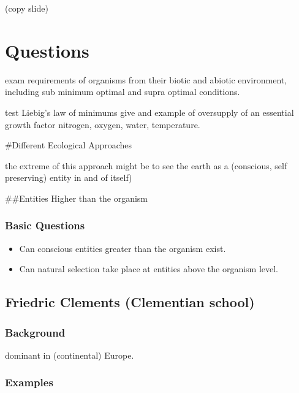 \documentclass[]{article}
\providecommand{\tightlist}{%
  \setlength{\itemsep}{0pt}\setlength{\parskip}{0pt}}
\begin{document}
(copy slide)

\hypertarget{questions}{%
\section{Questions}\label{questions}}

exam requirements of organisms from their biotic and abiotic
environment, including sub minimum optimal and supra optimal conditions.

test Liebig's law of minimums give and example of oversupply of an
essential growth factor nitrogen, oxygen, water, temperature.

\#Different Ecological Approaches

the extreme of this approach might be to see the earth as a (conscious,
self preserving) entity in and of itself)

\#\#Entities Higher than the organism

\hypertarget{basic-questions}{%
\subsubsection{Basic Questions}\label{basic-questions}}

\begin{itemize}
\tightlist
\item
  Can conscious entities greater than the organism exist.
\item
  Can natural selection take place at entities above the organism level.
\end{itemize}

\hypertarget{friedric-clements-clementian-school}{%
\subsection{Friedric Clements (Clementian
school)}\label{friedric-clements-clementian-school}}

\hypertarget{background-1}{%
\subsubsection{Background}\label{background-1}}

dominant in (continental) Europe.

\hypertarget{examples}{%
\subsubsection{Examples}\label{examples}}
\end{document}
